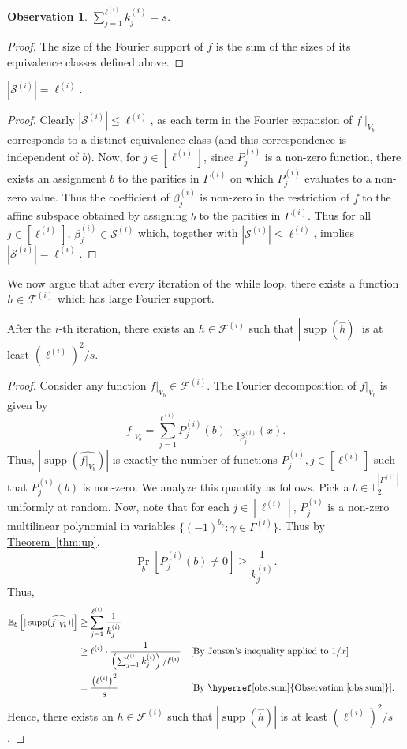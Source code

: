 \documentclass{toc}
\DeclareMathOperator{\Supp}{supp}
\newcommand{\lref}[2][]{\hyperref[#2]{#1~\ref*{#2}}}
\newtheorem{observation}[theorem]{Observation}
\begin{document}
\begin{observation}
\label{obs:sum}
$\displaystyle\sum_{j=1}^{\ell^{(i)}}k_j^{(i)}=s$.
\end{observation}
\begin{proof}
The size of the Fourier support of $f$ is the sum of the sizes of its equivalence classes defined above.
\end{proof}
\begin{proposition}
\label{prop:lbound}
$|\mathcal{S}^{(i)}| = \ell^{(i)}$.
\end{proposition}
\begin{proof}
 Clearly $|\mathcal{S}^{(i)}| \leq \ell^{(i)}$, as each term in the Fourier expansion of $f \mid_{V_b}$ corresponds to a distinct equivalence class (and this correspondence is independent of $b$). Now, for $j\in[\ell^{(i)}]$, since $P_j^{(i)}$ is a non-zero function, there exists an assignment $b$ to the parities in $\Gamma^{(i)}$ on which $P_j^{(i)}$ evaluates to
a non-zero value. Thus the coefficient of $\beta_j^{(i)}$ is non-zero in the restriction of $f$ to the affine subspace obtained by assigning $b$ to the parities in $\Gamma^{(i)}$.
Thus for all $j\in [\ell^{(i)}]$, $\beta_j^{(i)} \in \mathcal{S}^{(i)}$ which, together with $|\mathcal{S}^{(i)}| \leq \ell^{(i)}$, implies $|\mathcal{S}^{(i)}| = \ell^{(i)}$.
\end{proof}
We now argue that after every iteration of the while loop, there
exists a function $h \in \mathcal{F}^{(i)}$ which has large Fourier support.
\begin{lemma}
\label{lem:support}
After the $i$-th iteration, there exists an $h \in \mathcal{F}^{(i)}$ such
that $|\Supp(\widehat{h})|$ is at least $\left({\ell^{(i)}}\right)^2/{s}$.
\end{lemma}
\begin{proof}
Consider any function $f|_{V_b} \in \mathcal{F}^{(i)}$. The Fourier
decomposition of $f|_{V_b}$ is given by
\[
  f|_{V_b} =
  \sum_{j=1}^{\ell^{(i)}}P_j^{(i)}(b)\cdot \chi_{\beta_j^{(i)}}(x).
\]
Thus, $|\Supp(\widehat{f|_{V_b}})|$ is exactly the number of functions
$P_j^{(i)}, j\in [\ell^{(i)}]$ such that $P_j^{(i)}(b)$ is
non-zero. We analyze this quantity as follows. Pick a
$b \in \mathbb{F}_2^{|\Gamma^{(i)}|}$ uniformly at random. Now, note
that for each $j \in [\ell^{(i)}]$, $P_j^{(i)}$ is a non-zero
%
multilinear   %
polynomial
in variables $\{(-1)^{b_\gamma}: \gamma \in \Gamma^{(i)}\}$. Thus by \lref[Theorem]{thm:up},
$$\Pr_b[P_j^{(i)}(b) \neq 0] \geq \frac{1}{k_j^{(i)}}.$$ Thus,
\begin{align*}
\mathbb{E}_b\left[|\Supp(\widehat{f|_{V_b}})|\right] &\geq \sum_{j=1}^{\ell^{(i)}}
\frac{1}{k_j^{(i)}} \\
&\geq \ell^{(i)} \cdot \frac{1}{\left(\sum_{j=1}^{\ell^{(i)}}
    k_j^{(i)}\right)/\ell^{(i)}}  && \text{[By Jensen's inequality applied to $1/x$]}\\
&= \frac{\left(\ell^{(i)}\right)^2}{s} && \text{[By
  \lref[Observation]{obs:sum}]}.
\end{align*}
Hence, there exists an $h \in \mathcal{F}^{(i)}$ such
that $|\Supp(\widehat{h})|$ is at least $\left({\ell^{(i)}}\right)^2/{s}$.
\end{proof}
\end{document}
